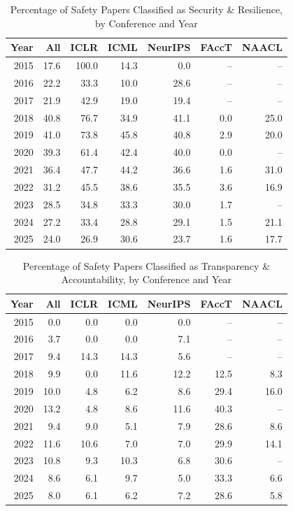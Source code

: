 \begin{table}[ht]
\centering
\caption{Percentage of Safety Papers Classified as Security \& Resilience, by Conference and Year} 
\label{tab:summary_security_resilience}
\begin{tabular}{rrrrrrr}
  \hline
Year & All & ICLR & ICML & NeurIPS & FAccT & NAACL \\ 
  \hline
2015 & 17.6 & 100.0 & 14.3 & 0.0 & -- & -- \\ 
  2016 & 22.2 & 33.3 & 10.0 & 28.6 & -- & -- \\ 
  2017 & 21.9 & 42.9 & 19.0 & 19.4 & -- & -- \\ 
  2018 & 40.8 & 76.7 & 34.9 & 41.1 & 0.0 & 25.0 \\ 
  2019 & 41.0 & 73.8 & 45.8 & 40.8 & 2.9 & 20.0 \\ 
  2020 & 39.3 & 61.4 & 42.4 & 40.0 & 0.0 & -- \\ 
  2021 & 36.4 & 47.7 & 44.2 & 36.6 & 1.6 & 31.0 \\ 
  2022 & 31.2 & 45.5 & 38.6 & 35.5 & 3.6 & 16.9 \\ 
  2023 & 28.5 & 34.8 & 33.3 & 30.0 & 1.7 & -- \\ 
  2024 & 27.2 & 33.4 & 28.8 & 29.1 & 1.5 & 21.1 \\ 
  2025 & 24.0 & 26.9 & 30.6 & 23.7 & 1.6 & 17.7 \\ 
   \hline
\end{tabular}
\end{table}
\begin{table}[ht]
\centering
\caption{Percentage of Safety Papers Classified as Transparency \& Accountability, by Conference and Year} 
\label{tab:summary_transparency_accountability}
\begin{tabular}{rrrrrrr}
  \hline
Year & All & ICLR & ICML & NeurIPS & FAccT & NAACL \\ 
  \hline
2015 & 0.0 & 0.0 & 0.0 & 0.0 & -- & -- \\ 
  2016 & 3.7 & 0.0 & 0.0 & 7.1 & -- & -- \\ 
  2017 & 9.4 & 14.3 & 14.3 & 5.6 & -- & -- \\ 
  2018 & 9.9 & 0.0 & 11.6 & 12.2 & 12.5 & 8.3 \\ 
  2019 & 10.0 & 4.8 & 6.2 & 8.6 & 29.4 & 16.0 \\ 
  2020 & 13.2 & 4.8 & 8.6 & 11.6 & 40.3 & -- \\ 
  2021 & 9.4 & 9.0 & 5.1 & 7.9 & 28.6 & 8.6 \\ 
  2022 & 11.6 & 10.6 & 7.0 & 7.0 & 29.9 & 14.1 \\ 
  2023 & 10.8 & 9.3 & 10.3 & 6.8 & 30.6 & -- \\ 
  2024 & 8.6 & 6.1 & 9.7 & 5.0 & 33.3 & 6.6 \\ 
  2025 & 8.0 & 6.1 & 6.2 & 7.2 & 28.6 & 5.8 \\ 
   \hline
\end{tabular}
\end{table}
